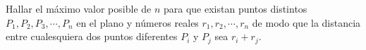 Hallar el máximo valor posible de $n$ para que existan puntos distintos $P_1, P_2, P_3, \cdots , P_n$ en el plano y números reales $r_1, r_2, \cdots , r_n$ de modo que la distancia entre cualesquiera dos puntos diferentes $P_i$ y $P_j$ sea $r_i + r_j$.
